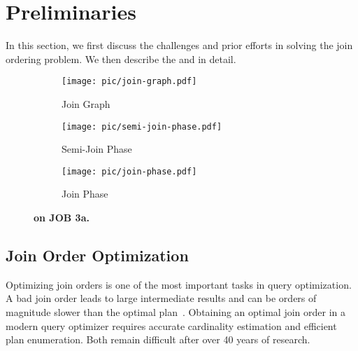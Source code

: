 \section{Preliminaries}
\label{sec:prelim}

In this section, we first discuss the challenges and prior efforts in solving the join ordering problem. We then describe the \YannAlg and \PT in detail.


\begin{figure*}[t!]
  \begin{subfigure}[t]{.25\linewidth}%
    \center
    \texttt{[image: pic/join-graph.pdf]}
    \caption{Join Graph}
    \label{fig:yannakakis-join-graph}
  \end{subfigure}
  \hfill
  \begin{subfigure}[t]{.42\linewidth}%
    \center
    \texttt{[image: pic/semi-join-phase.pdf]}
    \caption{Semi-Join Phase}
    \label{fig:yannakakis-semi-join}
  \end{subfigure}
  \hfill
  \begin{subfigure}[t]{.28\linewidth}%
    \center
    \texttt{[image: pic/join-phase.pdf]}
    \caption{Join Phase}
    \label{fig:yannakakis-join}
  \end{subfigure}
  \caption{
    \textbf{\YannAlg on JOB 3a.}
  }
  \label{fig:yannakakis}
\end{figure*}


\subsection{Join Order Optimization}
\label{sec:prelim:jo}

Optimizing join orders is one of the most important tasks in query optimization. A bad join order leads to large intermediate results and can be orders of magnitude slower than the optimal plan~\cite{selinger1979,2019tutorial_robust,leis2015HowGood}. Obtaining an optimal join order in a modern query optimizer requires accurate cardinality estimation and efficient plan enumeration. Both remain difficult after over 40 years of research.

